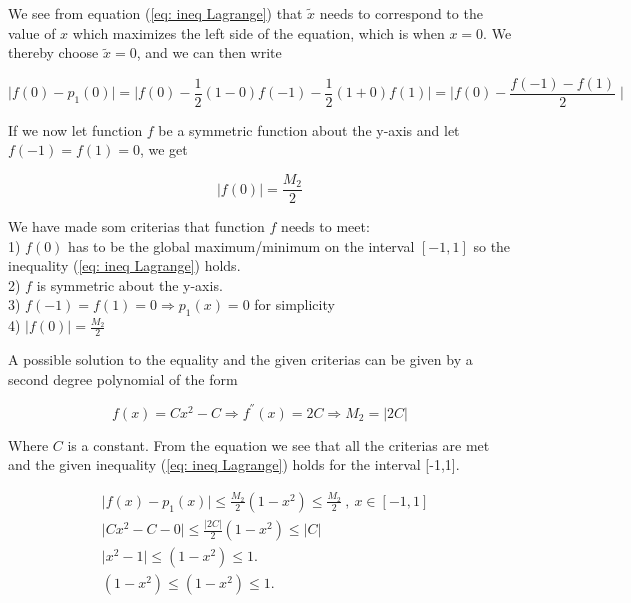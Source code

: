 We see from equation (\ref{eq: ineq Lagrange}) that $\tilde{x}$ needs to correspond to the value of $x$ which maximizes the left side of the equation, which is when $x=0$. We thereby choose $\tilde{x}=0$, and we can then write 

\begin{equation}
\label{eq: equal Lagrange 3}
\mid f(0)-p_{1}(0) \mid = \mid f(0) - \frac{1}{2}(1-0)f(-1) - \frac{1}{2}(1+0)f(1) \mid = \mid f(0)-\frac{f(-1) -f(1)}{2} \mid
\end{equation}

If we now let function $f$ be a symmetric function about the y-axis and let $f(-1)=f(1)=0$, we get

\begin{equation}
\label{eq: equal Lagrange 4}
\mid f(0) \mid = \frac{M_2}{2}
\end{equation} 

We have made som criterias that function $f$ needs to meet:\\ 
1) $f(0)$ has to be the global maximum/minimum on the interval $[-1,1]$ so the inequality (\ref{eq: ineq Lagrange}) holds.\\
2) $f$ is symmetric about the  y-axis.\\
3) $f(-1)=f(1)=0 \Longrightarrow p_1(x)=0$ for simplicity\\
4) $\mid f(0) \mid = \frac{M_2}{2}$

A possible solution to the equality and the given criterias can be given by a second degree polynomial of the form

\begin{equation}
\label{eq: Solution 1}
f(x)=Cx^2-C \Longrightarrow f^{''}(x)=2C\Longrightarrow M_2=|2C|
\end{equation}



Where $C$ is a constant. From the equation we see that all the criterias are met and the given inequality (\ref{eq: ineq Lagrange}) holds for the interval [-1,1].

\begin{equation}
    \label{eq: Solution 2}
    \begin{split}
    &\mid f(x)-p_{1}(x)\mid \leq \frac{M_{2}}{2}(1-x^{2})\leq\frac{M_{2}}{2} \: , \: x\in[-1,1] \\
    &\mid Cx^{2}-C - 0\mid \leq \frac{|2C|}{2}(1-x^{2}) \leq |C|\\
    &\mid x^{2} -1 \mid \leq (1-x^2) \leq 1.\\
    &(1-x^2)\leq(1-x^2) \leq 1.\\
    \end{split}
\end{equation}






